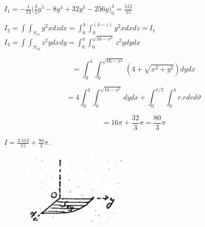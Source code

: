 \documentclass[11pt]{amsbook}
\begin{document}
$I_1= -\frac{1}{12} \Big(\frac{3}{5} y^5-8y^4+32y^3-256y \Big)_0^4=\frac{512}{15} $

$ I_2=\int\int_{S_{xz}} y^2x dzdx=\int_0^4\int_0^(4-z) y^2xdxdz=I_1$ \\
$ I_3=\int\int_{S_{xy}} z^2y dxdy = \int_0^4\int_0^{\sqrt{16-x^2}} z^2y dydx $

\[
	=\int_0^4\int_0^{\sqrt{16-x^2}} (4+\sqrt{x^2+y^2}) dydx
\]



\[
	=4\int_0^4\int_0^{\sqrt{16-x^2}} dydx + \int_0^{\pi/2}\int_0^4 r.r drd\vartheta
\]

\[
	=16\pi + \frac{32}{3} \pi=\frac{80}{3} \pi
\]

$I=\frac{2.512}{15} +\frac{80}{3} \pi.$

\begin{figure}
\includegraphics[width=0.45\textwidth]{images/b2p2-413-fig04}
\end{figure}
\end{document}
